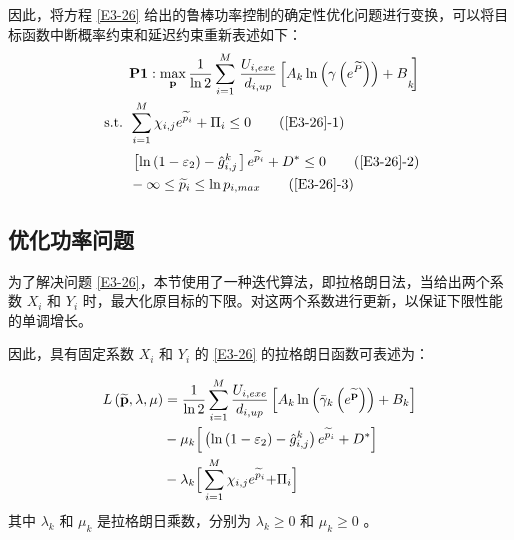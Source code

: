 因此，将方程 \eqref{E3-26} 给出的鲁棒功率控制的确定性优化问题进行变换，可以将目标函数中断概率约束和延迟约束重新表述如下：
\begin{align}
&\textbf{P1}:\max\limits_{\mathbf{p}}\frac{1}{\ln{2}}\sum_{i=1}^{M}\left.\frac{U_{i,exe}}{d_{i,up}}
\left[{A_k\ln{\left(\gamma\left(e^{\widetilde{P}}\right)\right)}+B}_k\!\!\right.\right]                         \label{E3-26}\\
\text { s.t. }
& \sum_{i=1}^{M}{\chi_{i,j}e^{{\widetilde{p}}_i}}+\mathrm{\Pi}_i\le0                                           \tag{\ref{E3-26}{-1}}      \label{E3-26-1}\\  %
& \left.\left[\ln\left(1-\varepsilon_2\right)-{\hat{g}}_{i,j}^k\right.\right]e^{{\widetilde{p}}_i}+D^\ast\le0  \tag{\ref{E3-26}{-2}}      \label{E3-26-2}\\  %
& -\infty\le{\widetilde{p}}_i\le \ln{p_{i,max}}                                                                \tag{\ref{E3-26}{-3}}      \label{E3-26-3}  %
\end{align}
\subsection{优化功率问题}\label{section3-3-3}
为了解决问题 \eqref{E3-26}，本节使用了一种迭代算法，即拉格朗日法，当给出两个系数 $X_i$ 和 $Y_i$ 时，最大化原目标的下限。对这两个系数进行更新，以保证下限性能的单调增长。

因此，具有固定系数 $X_i$ 和 $Y_i$ 的 \eqref{E3-26} 的拉格朗日函数可表述为：

\begin{align}\label{E27}
L\left(\widetilde{\mathbf{p}},\lambda,\mu\right)&=\frac{1}{\ln{2}}\sum_{i=1}^{M}{\frac{U_{i,exe}}{d_{i,up}}\left[A_k\ln{\left({\bar{\gamma}}_k\left(e^{\widetilde{\mathbf{p}}}\right)\right)}+B_k\right]}\\
&\notag-\mu_k\Big[\left(\ln\left(1-\varepsilon_2\right)-{\hat{g}}_{i,j}^k\right)e^{{\widetilde{p}}_i}+D^\ast\Big]\\
&-\lambda_k\Big[\sum_{i=1}^{M}{\chi_{i,j}e^{{\widetilde{p}}_i}}{+\mathrm{\Pi}}_i\Big]\notag
\end{align}
其中 $\lambda_k$ 和 $\mu_k$ 是拉格朗日乘数，分别为 $\lambda_k\geq0$ 和 $\mu_k\geq0$ 。

